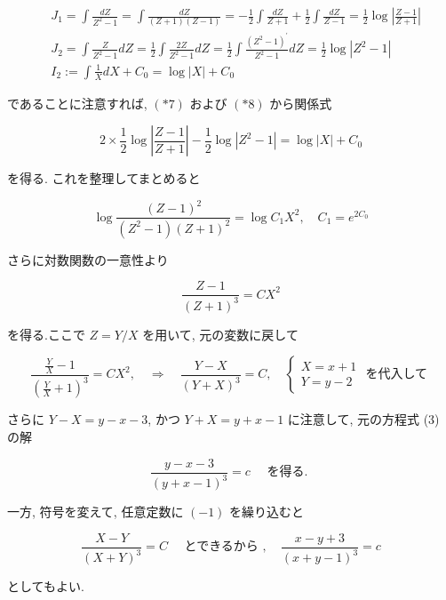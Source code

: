\documentclass[10pt]{jsarticle}
\begin{document}
$$
\begin{aligned}
& J_{1}=\int \frac{d Z}{Z^{2}-1}=\int \frac{d Z}{(Z+1)(Z-1)}=-\frac{1}{2} \int \frac{d Z}{Z+1}+\frac{1}{2} \int \frac{d Z}{Z-1}=\frac{1}{2} \log \left|\frac{Z-1}{Z+1}\right| \\
& J_{2}=\int \frac{Z}{Z^{2}-1} d Z=\frac{1}{2} \int \frac{2 Z}{Z^{2}-1} d Z=\frac{1}{2} \int \frac{\left(Z^{2}-1\right)^{\prime}}{Z^{2}-1} d Z=\frac{1}{2} \log \left|Z^{2}-1\right| \\
& I_{2}:=\int \frac{1}{X} d X+C_{0}=\log |X|+C_{0}
\end{aligned}
$$

であることに注意すれば, $(* 7)$ および $(* 8)$ から関係式


\begin{equation*}
2 \times \frac{1}{2} \log \left|\frac{Z-1}{Z+1}\right|-\frac{1}{2} \log \left|Z^{2}-1\right|=\log |X|+C_{0} \tag{*9}
\end{equation*}


を得る. これを整理してまとめると

$$
\log \frac{(Z-1)^{2}}{\left(Z^{2}-1\right)(Z+1)^{2}}=\log C_{1} X^{2}, \quad C_{1}=e^{2 C_{0}}
$$

さらに対数関数の一意性より


\begin{equation*}
\frac{Z-1}{(Z+1)^{3}}=C X^{2} \tag{*10}
\end{equation*}


を得る.ここで $Z=Y / X$ を用いて, 元の変数に戻して

$$
\frac{\frac{Y}{X}-1}{\left(\frac{Y}{X}+1\right)^{3}}=C X^{2}, \quad \Longrightarrow \quad \frac{Y-X}{(Y+X)^{3}}=C, \quad\left\{\begin{array}{l}
X=x+1 \\
Y=y-2
\end{array}\right. \text { を代入して }
$$

さらに $Y-X=y-x-3$, かつ $Y+X=y+x-1$ に注意して, 元の方程式 (3) の解

$$
\frac{y-x-3}{(y+x-1)^{3}}=c \quad \text { を得る. }
$$

一方, 符号を変えて, 任意定数に $(-1)$ を繰り込むと

$$
\frac{X-Y}{(X+Y)^{3}}=C \quad \text { とできるから }, \quad \frac{x-y+3}{(x+y-1)^{3}}=c
$$

としてもよい.

\bigskip
\bigskip
\bigskip
\bigskip
\bigskip
\bigskip
\bigskip
\bigskip
\bigskip
\bigskip
\bigskip
\bigskip
\bigskip
\bigskip
\bigskip
\bigskip
\end{document}
